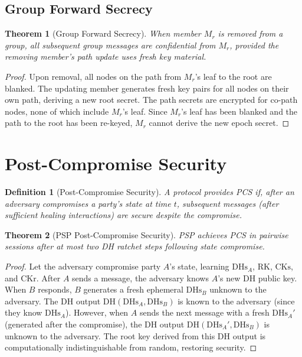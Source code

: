 \documentclass[11pt,a4paper]{article}
\newtheorem{definition}{Definition}[section]
\newtheorem{theorem}{Theorem}[section]
\begin{document}
\subsection{Group Forward Secrecy}

\begin{theorem}[Group Forward Secrecy]
    When member $M_r$ is removed from a group, all subsequent group
    messages are confidential from $M_r$, provided the removing member's
    path update uses fresh key material.
\end{theorem}

\begin{proof}
    Upon removal, all nodes on the path from $M_r$'s leaf to the root are
    blanked.  The updating member generates fresh key pairs for all nodes
    on their own path, deriving a new root secret.  The path secrets are
    encrypted for co-path nodes, none of which include $M_r$'s leaf.
    Since $M_r$'s leaf has been blanked and the path to the root has been
    re-keyed, $M_r$ cannot derive the new epoch secret.
\end{proof}

\section{Post-Compromise Security}
\label{sec:pcs}

\begin{definition}[Post-Compromise Security]
    A protocol provides PCS if, after an adversary compromises a party's
    state at time $t$, subsequent messages (after sufficient healing
    interactions) are secure despite the compromise.
\end{definition}

\begin{theorem}[PSP Post-Compromise Security]
    PSP achieves PCS in pairwise sessions after at most two DH ratchet
    steps following state compromise.
\end{theorem}

\begin{proof}
    Let the adversary compromise party $A$'s state, learning
    $\mathrm{DHs}_A$, $\mathrm{RK}$, $\mathrm{CKs}$, and
    $\mathrm{CKr}$.  After $A$ sends a message, the adversary knows
    $A$'s new DH public key.  When $B$ responds, $B$ generates a fresh
    ephemeral $\mathrm{DHs}_B$ unknown to the adversary.  The DH output
    $\mathrm{DH}(\mathrm{DHs}_A, \mathrm{DHs}_B)$ is known to the
    adversary (since they know $\mathrm{DHs}_A$).  However, when $A$
    sends the next message with a fresh $\mathrm{DHs}_A'$ (generated
    after the compromise), the DH output
    $\mathrm{DH}(\mathrm{DHs}_A', \mathrm{DHs}_B)$ is unknown to the
    adversary.  The root key derived from this DH output is
    computationally indistinguishable from random, restoring security.
\end{proof}
\end{document}
